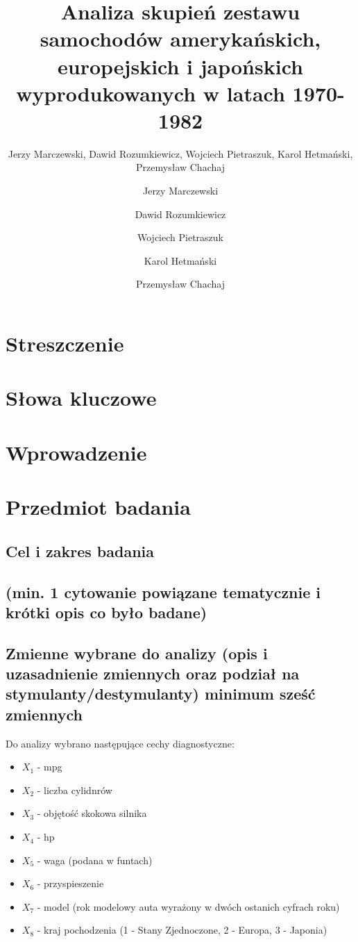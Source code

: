 \documentclass{article}
\title{Analiza skupień zestawu samochodów amerykańskich, europejskich i japońskich wyprodukowanych w latach 1970-1982}
\author{\fontsize{11}{13}\selectfont Jerzy Marczewski, \newline Dawid Rozumkiewicz, Wojciech Pietraszuk, Karol Hetmański, Przemysław Chachaj}
\author{
  Jerzy Marczewski\\
  \and
  Dawid Rozumkiewicz\\
  \and
  Wojciech Pietraszuk\\
  \and
  Karol Hetmański\\
  \and
  Przemysław Chachaj\\
}
\date{}
\begin{document}
\maketitle

\section{Streszczenie}

\section{Słowa kluczowe}

\section{Wprowadzenie}

\section{Przedmiot badania}
    \subsection{Cel i zakres badania} 
    \subsection{(min. 1 cytowanie powiązane tematycznie i krótki opis co było badane)}
    \subsection{Zmienne wybrane do analizy (opis i uzasadnienie zmiennych oraz podział na stymulanty/destymulanty) minimum sześć zmiennych}
    Do analizy wybrano następujące cechy diagnostyczne:
    \begin{itemize}
        \item ${X_1}$ - mpg
        \item ${X_2}$ - liczba cylidnrów 
        \item ${X_3}$ - objętość skokowa silnika
        \item ${X_4}$ - hp
        \item ${X_5}$ - waga (podana w funtach)
        \item ${X_6}$ - przyspieszenie
        \item ${X_7}$ - model (rok modelowy auta wyrażony w dwóch ostanich cyfrach roku)
        \item ${X_8}$ - kraj pochodzenia (1 - Stany Zjednoczone, 2 - Europa, 3 - Japonia)
    \end{itemize}
    
\end{document}
